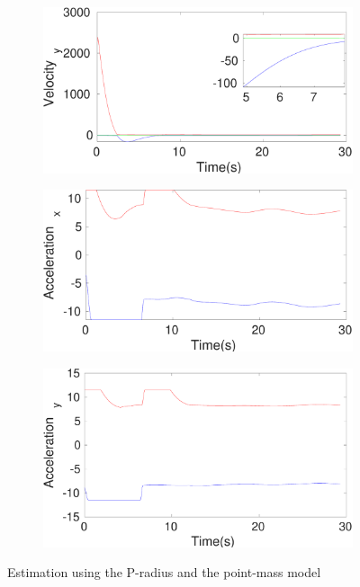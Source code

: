 \begin{figure}[h]
\begin{subfigure}{.5\linewidth}
\end{subfigure}
\begin{subfigure}{.5\linewidth}
\centering
\includegraphics[width=\linewidth]{figures/Prad/s3pmpradVelocity_y}
\end{subfigure}
\begin{subfigure}{.5\linewidth}
\centering
\includegraphics[width=\linewidth]{figures/Prad/s3pmpradAcceleration_x}
\end{subfigure}
\begin{subfigure}{.5\linewidth}
\centering
\includegraphics[width=\linewidth]{figures/Prad/s3pmpradAcceleration_y}
\end{subfigure}
\caption{Estimation using the P-radius and the point-mass model}
\end{figure}


